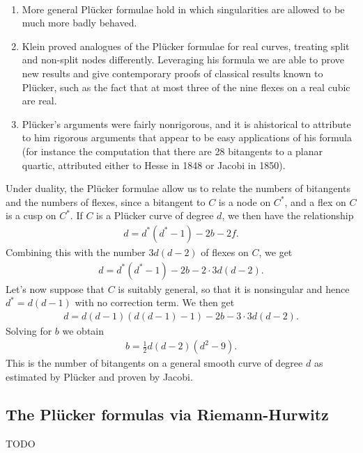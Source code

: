 \documentclass[11pt]{amsart}
\begin{document}
\begin{remark} \,
\begin{enumerate}
    \item More general Pl\"{u}cker formulae hold in which singularities are allowed to be much more badly behaved.
    \item Klein proved analogues of the Pl\"{u}cker formulae for real curves, treating split and non-split nodes differently. Leveraging his formula we are able to prove new results and give contemporary proofs of classical results known to Pl\"{u}cker, such as the fact that at most three of the nine flexes on a real cubic are real.
    \item Pl\"{u}cker's arguments were fairly nonrigorous, and it is ahistorical to attribute to him rigorous arguments that appear to be easy applications of his formula (for instance the computation that there are 28 bitangents to a planar quartic, attributed either to Hesse in 1848 or Jacobi in 1850).
\end{enumerate}
\end{remark}

Under duality, the Pl\"{u}cker formulae allow us to relate the numbers of bitangents and the numbers of flexes, since a bitangent to $C$ is a node on $C^\ast$, and a flex on $C$ is a cusp on $C^\ast$. If $C$ is a Pl\"{u}cker curve of degree $d$, we then have the relationship
\begin{align*}
    d = d^\ast(d^\ast-1) - 2b - 2f.
\end{align*}
Combining this with the number $3d(d-2)$ of flexes on $C$, we get
\begin{align*}
    d = d^\ast(d^\ast-1) - 2b - 2\cdot 3d(d-2).
\end{align*}
Let's now suppose that $C$ is suitably general, so that it is nonsingular and hence $d^\ast = d(d-1)$ with no correction term. We then get
\begin{align*}
    d = d(d-1)\left( d(d-1)-1 \right) - 2b - 3\cdot 3d(d-2).
\end{align*}
Solving for $b$ we obtain
\begin{equation}\label{eqn:bitangents-in-terms-of-degree}
\begin{aligned}
    b = \frac{1}{2}d(d-2)(d^2-9).
\end{aligned}
\end{equation}
This is the number of bitangents on a general smooth curve of degree $d$ as estimated by Pl\"{u}cker and proven by Jacobi.

\subsection{The Pl\"ucker formulas via Riemann-Hurwitz} TODO
\end{document}
